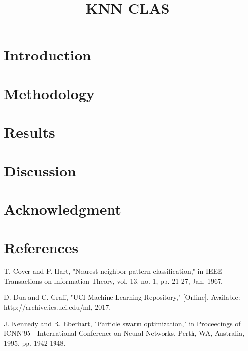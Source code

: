 \documentclass[conference]{IEEEtran}
\begin{document}
\title{KNN CLAS}

\author{
}

\maketitle

\begin{abstract}

\end{abstract}

\begin{IEEEkeywords}

\end{IEEEkeywords}

\section{Introduction}

\section{Methodology}

\section{Results}



\section{Discussion}

\section*{Acknowledgment}

\section*{References}

\begin{thebibliography}{00}
 T. Cover and P. Hart, "Nearest neighbor pattern classification," in IEEE Transactions on Information Theory, vol. 13, no. 1, pp. 21-27, Jan. 1967.

 D. Dua and C. Graff, "UCI Machine Learning Repository," [Online]. Available: http://archive.ics.uci.edu/ml, 2017.

 J. Kennedy and R. Eberhart, "Particle swarm optimization," in Proceedings of ICNN'95 - International Conference on Neural Networks, Perth, WA, Australia, 1995, pp. 1942-1948.
\end{thebibliography}
\end{document}
